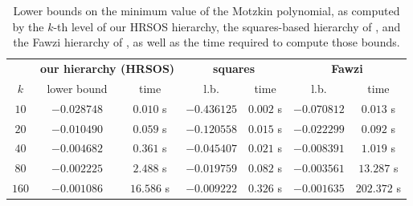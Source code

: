 \documentclass[11pt]{article}
\numberwithin{theorem}{section}
\theoremstyle{definition}
\begin{document}
\begin{table}[!htb]
    \begin{center}
        \begin{tabular}{ @{ \ }ccc@{ \qquad }cc@{ \qquad }cc@{ \ } }
            \toprule
            & \multicolumn{2}{c}{\textbf{our hierarchy (HRSOS)}}& \multicolumn{2}{c}{\textbf{squares} \cite{cristancho2024harmonic}} & \multicolumn{2}{c}{\textbf{Fawzi} \cite{cristancho2024harmonic}} \\
            $k$ & lower bound & time & l.b. & time & l.b. & time \\ \midrule
            $10$ & $-0.028748$ & $0.010$ s & $-0.436125$ & $0.002$ s & $-0.070812$ & $0.013$ s \\
            $20$ & $-0.010490$ & $0.059$ s & $-0.120558$ & $0.015$ s & $-0.022299$ & $0.092$ s \\
            $40$ & $-0.004682$ & $0.361$ s & $-0.045407$ & $0.021$ s & $-0.008391$ & $1.019$ s \\
            $80$ & $-0.002225$ & $2.488$ s & $-0.019759$ & $0.082$ s & $-0.003561$ & $13.287$ s \\
            $160$ & $-0.001086$ & $16.586$ s & $-0.009222$ & $0.326$ s & $-0.001635$ & $202.372$ s \\\bottomrule
        \end{tabular}
        \caption{Lower bounds on the minimum value of the Motzkin polynomial, as computed by the $k$-th level of our HRSOS hierarchy, the squares-based hierarchy of \cite{cristancho2024harmonic}, and the Fawzi hierarchy of \cite{cristancho2024harmonic}, as well as the time required to compute those bounds.}\label{tab:motzkin_numerics}
    \end{center}
\end{table}

\end{document}
